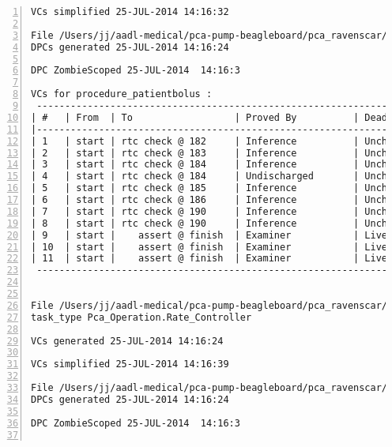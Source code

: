 \begin{lstlisting}[gobble=0, numbers=left, caption={POGS report for PCA Pump prototype}, label={listing:pca_ravenscar:pogs_full}]
VCs simplified 25-JUL-2014 14:16:32

File /Users/jj/aadl-medical/pca-pump-beagleboard/pca_ravenscar/pca_operation/patientbolus.dpc
DPCs generated 25-JUL-2014 14:16:24

DPC ZombieScoped 25-JUL-2014  14:16:3

VCs for procedure_patientbolus :
 -----------------------------------------------------------------------------
| #   | From  | To                  | Proved By          | Dead Path | Status |
|-----------------------------------------------------------------------------
| 1   | start | rtc check @ 182     | Inference          | Unchecked |   IU   |
| 2   | start | rtc check @ 183     | Inference          | Unchecked |   IU   |
| 3   | start | rtc check @ 184     | Inference          | Unchecked |   IU   |
| 4   | start | rtc check @ 184     | Undischarged       | Unchecked |   UU   |
| 5   | start | rtc check @ 185     | Inference          | Unchecked |   IU   |
| 6   | start | rtc check @ 186     | Inference          | Unchecked |   IU   |
| 7   | start | rtc check @ 190     | Inference          | Unchecked |   IU   |
| 8   | start | rtc check @ 190     | Inference          | Unchecked |   IU   |
| 9   | start |    assert @ finish  | Examiner           | Live      |   EL   |
| 10  | start |    assert @ finish  | Examiner           | Live      |   EL   |
| 11  | start |    assert @ finish  | Examiner           | Live      |   EL   |
 -----------------------------------------------------------------------------


File /Users/jj/aadl-medical/pca-pump-beagleboard/pca_ravenscar/pca_operation/rate_controller.vcg
task_type Pca_Operation.Rate_Controller

VCs generated 25-JUL-2014 14:16:24

VCs simplified 25-JUL-2014 14:16:39

File /Users/jj/aadl-medical/pca-pump-beagleboard/pca_ravenscar/pca_operation/rate_controller.dpc
DPCs generated 25-JUL-2014 14:16:24

DPC ZombieScoped 25-JUL-2014  14:16:3


\end{lstlisting}
